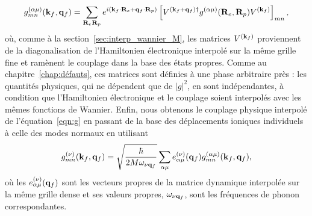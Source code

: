 \begin{equation}
    g_{mn}^{(\alpha\mu)}(\mathbf{k}_f,\mathbf{q}_f) = \sum_{\mathbf{R}_e\mathbf{R}_p}
    e^{i(\mathbf{k}_f\cdot\mathbf{R}_e+\mathbf{q}_f\cdot\mathbf{R}_p)}
    \left[V^{(\mathbf{k}_f+\mathbf{q}_f)\dag}g^{(\alpha\mu)}(\mathbf{R}_e,\mathbf{R}_p)V^{(\mathbf{k}_f)}\right]_{mn},
    \label{eqn:g_interp}
\end{equation}
où, comme à la section~\ref{sec:interp_wannier_M}, les matrices $V^{(\mathbf{k}_f)}$ proviennent de la diagonalisation de l'Hamiltonien électronique interpolé sur la même grille fine et ramènent le couplage dans la base des états propres. Comme au chapitre~\ref{chap:défauts}, ces matrices sont définies à une phase arbitraire près : les quantités physiques, qui ne dépendent que de $|g|^2$, en sont indépendantes, à condition que l'Hamiltonien électronique et le couplage soient interpolés avec les mêmes fonctions de Wannier. Enfin, nous obtenons le couplage physique interpolé de l'équation~\eqref{eqn:g} en passant de la base des déplacements ioniques individuels à celle des modes normaux en utilisant
\begin{equation}
        g_{mn}^{(\nu)}(\mathbf{k}_f,\mathbf{q}_f) =
    \sqrt{\frac{\hbar}{2M\omega_{\nu\mathbf{q}_f}}}\sum_{\alpha\mu}
    e^{(\nu)}_{\alpha\mu}(\mathbf{q}_f)g_{mn}^{(\alpha\mu)}(\mathbf{k}_f,\mathbf{q}_f),
    \label{eqn:g_modes}
\end{equation}
où les $e^{(\nu)}_{\alpha\mu}(\mathbf{q}_f)$ sont les vecteurs propres de la matrice dynamique interpolée sur la même grille dense et ses valeurs propres, $\omega_{\nu\mathbf{q}_f}$, sont les fréquences de phonon correspondantes.

